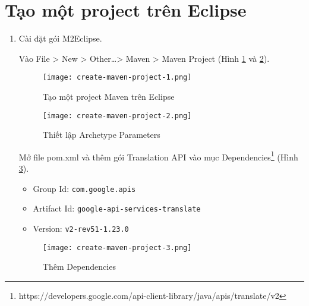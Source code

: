 \documentclass[../thesis.tex]{subfiles}
\begin{document}
\section{Tạo một project trên Eclipse}
\begin{enumerate}
	\item Cài đặt gói M2Eclipse.
	\begin{item}
	Vào File > New > Other\ldots > Maven > Maven Project (Hình \ref{Tao mot project Maven tren Eclipse} và \ref{Thiet lap Archetype Parameters}).
	\begin{figure}
		\texttt{[image: create-maven-project-1.png]}
		\caption{Tạo một project Maven trên Eclipse}
		\label{Tao mot project Maven tren Eclipse}
	\end{figure}
	\begin{figure}
		\texttt{[image: create-maven-project-2.png]}
		\caption{Thiết lập Archetype Parameters}
		\label{Thiet lap Archetype Parameters}
	\end{figure}
	\end{item}	
	\begin{item}
	Mở file pom.xml và thêm gói Translation API vào mục Dependencies\footnote{https://developers.google.com/api-client-library/java/apis/translate/v2} (Hình \ref{Them Dependencies}).
	\begin{itemize}
		\item Group Id: \lstinline{com.google.apis}
		\item Artifact Id: \lstinline{google-api-services-translate}
		\item Version: \lstinline{v2-rev51-1.23.0}
	\end{itemize}
	\begin{figure}
		\texttt{[image: create-maven-project-3.png]}
		\caption{Thêm Dependencies}
		\label{Them Dependencies}
	\end{figure}
	\end{item}
\end{enumerate}
\end{document}
